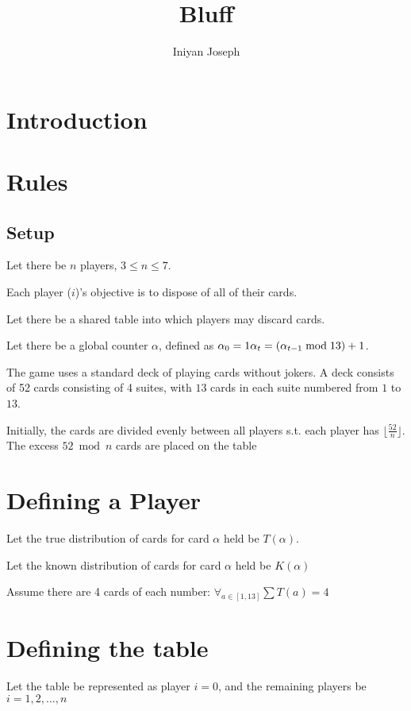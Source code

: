 \documentclass[a4paper,11pt]{article}
\title{Bluff}
\author{Iniyan Joseph}
\begin{document}
\maketitle

\begin{abstract}
\end{abstract}

\section{Introduction}
\section{Rules}
\begin{description}
    \subsection{Setup}
    \item Let there be $n$ players, $3\leq n\leq 7$.
    \item [Objective] Each player ($i$)'s objective is to dispose of all of their cards.
    \item Let there be a shared table into which players may discard cards.
    \item Let there be a global counter $\alpha$, defined as $\alpha_{0} = 1 \\ \alpha_{t} = (\alpha_{t-1} \bmod 13) + 1$.
    \item The game uses a standard deck of playing cards without jokers. 
    \subitem A deck consists of 52 cards consisting of 4 suites, with $13$ cards in each suite numbered from $1$ to $13$. 
    \item Initially, the cards are divided evenly between all players s.t. each player has $\lfloor\frac{52}{n}\rfloor$. The excess  $52 \bmod n$ cards are placed on the table
    \section{Defining a Player}
    \item Let the true distribution of cards for card $\alpha$ held be $T(\alpha)$. 
    \item Let the known distribution of cards for card $\alpha$ held be $K(\alpha)$
    \item Assume there are 4 cards of each number: $\forall_{a \in [1, 13]}\sum T(a) = 4$
    \section{Defining the table}
    \item Let the table be represented as player $i=0$, and the remaining players be $i=1, 2,..., n$

\end{description}
\end{document}

